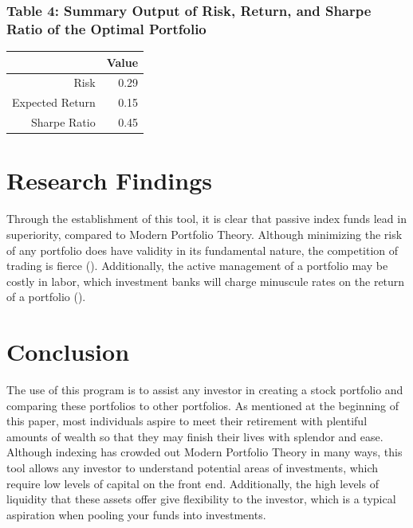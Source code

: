 \documentclass[12pt,english]{article}
\begin{document}
\begin{doublespace}
            \subsubsection{Table 4: Summary Output of Risk, Return, and Sharpe Ratio of the Optimal Portfolio}
                \begin{table}[ht]
                \centering
                \begin{tabular}{rr}
                \hline
                & Value \\ 
                \hline
                Risk & 0.29 \\ 
                Expected Return & 0.15 \\ 
                Sharpe Ratio & 0.45 \\ 
                \hline
                \end{tabular}
                \end{table}

    \section{Research Findings}\label{sec:results}\indent{}\indent{} %
    
        Through the establishment of this tool, it is clear that passive index funds lead in superiority, compared to Modern Portfolio Theory. Although minimizing the risk of any portfolio does have validity in its fundamental nature, the competition of trading is fierce (\citet{Zucker2020}). Additionally, the active management of a portfolio may be costly in labor, which investment banks will charge minuscule rates on the return of a portfolio (\citet{Zucker2020}).
    
    \section{Conclusion}\label{sec:conclusion}\indent{}\indent{} %
        The use of this program is to assist any investor in creating a stock portfolio and comparing these portfolios to other portfolios. As mentioned at the beginning of this paper, most individuals aspire to meet their retirement with plentiful amounts of wealth so that they may finish their lives with splendor and ease. Although indexing has crowded out Modern Portfolio Theory in many ways, this tool allows any investor to understand potential areas of investments, which require low levels of capital on the front end. Additionally, the high levels of liquidity that these assets offer give flexibility to the investor, which is a typical aspiration when pooling your funds into investments.
    
        \end{doublespace}
    
\end{document}
